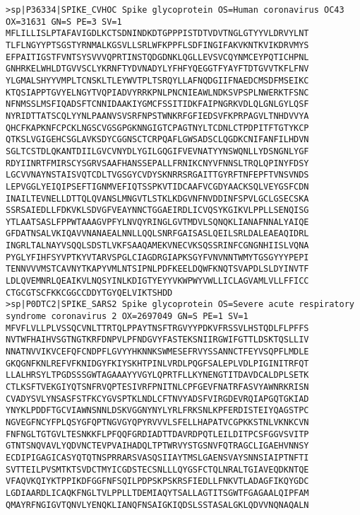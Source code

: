 \documentclass[en,black,12pt,normal]{elegantnote}
\begin{document}
\begin{lstlisting}
>sp|P36334|SPIKE_CVHOC Spike glycoprotein OS=Human coronavirus OC43 OX=31631 GN=S PE=3 SV=1
MFLILLISLPTAFAVIGDLKCTSDNINDKDTGPPPISTDTVDVTNGLGTYYVLDRVYLNT
TLFLNGYYPTSGSTYRNMALKGSVLLSRLWFKPPFLSDFINGIFAKVKNTKVIKDRVMYS
EFPAITIGSTFVNTSYSVVVQPRTINSTQDGDNKLQGLLEVSVCQYNMCEYPQTICHPNL
GNHRKELWHLDTGVVSCLYKRNFTYDVNADYLYFHFYQEGGTFYAYFTDTGVVTKFLFNV
YLGMALSHYYVMPLTCNSKLTLEYWVTPLTSRQYLLAFNQDGIIFNAEDCMSDFMSEIKC
KTQSIAPPTGVYELNGYTVQPIADVYRRKPNLPNCNIEAWLNDKSVPSPLNWERKTFSNC
NFNMSSLMSFIQADSFTCNNIDAAKIYGMCFSSITIDKFAIPNGRKVDLQLGNLGYLQSF
NYRIDTTATSCQLYYNLPAANVSVSRFNPSTWNKRFGFIEDSVFKPRPAGVLTNHDVVYA
QHCFKAPKNFCPCKLNGSCVGSGPGKNNGIGTCPAGTNYLTCDNLCTPDPITFTGTYKCP
QTKSLVGIGEHCSGLAVKSDYCGGNSCTCRPQAFLGWSADSCLQGDKCNIFANFILHDVN
SGLTCSTDLQKANTDIILGVCVNYDLYGILGQGIFVEVNATYYNSWQNLLYDSNGNLYGF
RDYIINRTFMIRSCYSGRVSAAFHANSSEPALLFRNIKCNYVFNNSLTRQLQPINYFDSY
LGCVVNAYNSTAISVQTCDLTVGSGYCVDYSKNRRSRGAITTGYRFTNFEPFTVNSVNDS
LEPVGGLYEIQIPSEFTIGNMVEFIQTSSPKVTIDCAAFVCGDYAACKSQLVEYGSFCDN
INAILTEVNELLDTTQLQVANSLMNGVTLSTKLKDGVNFNVDDINFSPVLGCLGSECSKA
SSRSAIEDLLFDKVKLSDVGFVEAYNNCTGGAEIRDLICVQSYKGIKVLPPLLSENQISG
YTLAATSASLFPPWTAAAGVPFYLNVQYRINGLGVTMDVLSQNQKLIANAFNNALYAIQE
GFDATNSALVKIQAVVNANAEALNNLLQQLSNRFGAISASLQEILSRLDALEAEAQIDRL
INGRLTALNAYVSQQLSDSTLVKFSAAQAMEKVNECVKSQSSRINFCGNGNHIISLVQNA
PYGLYFIHFSYVPTKYVTARVSPGLCIAGDRGIAPKSGYFVNVNNTWMYTGSGYYYPEPI
TENNVVVMSTCAVNYTKAPYVMLNTSIPNLPDFKEELDQWFKNQTSVAPDLSLDYINVTF
LDLQVEMNRLQEAIKVLNQSYINLKDIGTYEYYVKWPWYVWLLICLAGVAMLVLLFFICC
CTGCGTSCFKKCGGCCDDYTGYQELVIKTSHDD
>sp|P0DTC2|SPIKE_SARS2 Spike glycoprotein OS=Severe acute respiratory syndrome coronavirus 2 OX=2697049 GN=S PE=1 SV=1
MFVFLVLLPLVSSQCVNLTTRTQLPPAYTNSFTRGVYYPDKVFRSSVLHSTQDLFLPFFS
NVTWFHAIHVSGTNGTKRFDNPVLPFNDGVYFASTEKSNIIRGWIFGTTLDSKTQSLLIV
NNATNVVIKVCEFQFCNDPFLGVYYHKNNKSWMESEFRVYSSANNCTFEYVSQPFLMDLE
GKQGNFKNLREFVFKNIDGYFKIYSKHTPINLVRDLPQGFSALEPLVDLPIGINITRFQT
LLALHRSYLTPGDSSSGWTAGAAAYYVGYLQPRTFLLKYNENGTITDAVDCALDPLSETK
CTLKSFTVEKGIYQTSNFRVQPTESIVRFPNITNLCPFGEVFNATRFASVYAWNRKRISN
CVADYSVLYNSASFSTFKCYGVSPTKLNDLCFTNVYADSFVIRGDEVRQIAPGQTGKIAD
YNYKLPDDFTGCVIAWNSNNLDSKVGGNYNYLYRLFRKSNLKPFERDISTEIYQAGSTPC
NGVEGFNCYFPLQSYGFQPTNGVGYQPYRVVVLSFELLHAPATVCGPKKSTNLVKNKCVN
FNFNGLTGTGVLTESNKKFLPFQQFGRDIADTTDAVRDPQTLEILDITPCSFGGVSVITP
GTNTSNQVAVLYQDVNCTEVPVAIHADQLTPTWRVYSTGSNVFQTRAGCLIGAEHVNNSY
ECDIPIGAGICASYQTQTNSPRRARSVASQSIIAYTMSLGAENSVAYSNNSIAIPTNFTI
SVTTEILPVSMTKTSVDCTMYICGDSTECSNLLLQYGSFCTQLNRALTGIAVEQDKNTQE
VFAQVKQIYKTPPIKDFGGFNFSQILPDPSKPSKRSFIEDLLFNKVTLADAGFIKQYGDC
LGDIAARDLICAQKFNGLTVLPPLLTDEMIAQYTSALLAGTITSGWTFGAGAALQIPFAM
QMAYRFNGIGVTQNVLYENQKLIANQFNSAIGKIQDSLSSTASALGKLQDVVNQNAQALN

\end{lstlisting}
\end{document}
